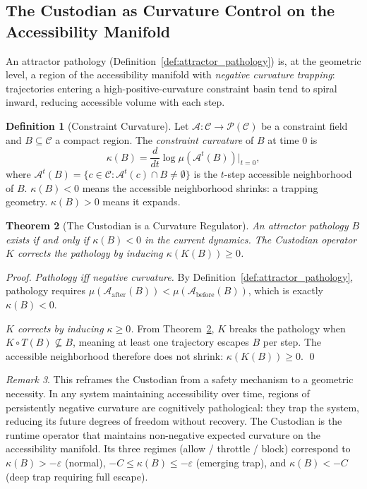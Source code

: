 \documentclass[12pt, a4paper, twoside]{article}
\theoremstyle{plain}
\newtheorem{theorem}{Theorem}[section]
\theoremstyle{definition}
\newtheorem{definition}[theorem]{Definition}
\theoremstyle{remark}
\newtheorem{remark}[theorem]{Remark}
\newcommand{\Acc}{\mathcal{A}}
\newcommand{\Conf}{\mathcal{C}}
\begin{document}
\subsection{The Custodian as Curvature Control on the Accessibility Manifold}

An attractor pathology (Definition~\ref{def:attractor_pathology}) is, at the
geometric level, a region of the accessibility manifold with \emph{negative
curvature trapping}: trajectories entering a high-positive-curvature constraint
basin tend to spiral inward, reducing accessible volume with each step.

\begin{definition}[Constraint Curvature]
\label{def:constraint_curvature}
Let $\Acc: \Conf \to \mathcal{P}(\Conf)$ be a constraint field and
$B \subseteq \Conf$ a compact region. The \emph{constraint curvature} of $B$
at time $0$ is
\[
  \kappa(B) = \frac{d}{dt}\log\mu(\Acc^t(B))\bigg|_{t=0},
\]
where $\Acc^t(B) = \{c \in \Conf : \Acc^t(c) \cap B \neq \emptyset\}$ is the
$t$-step accessible neighborhood of $B$. $\kappa(B)<0$ means the accessible
neighborhood shrinks: a trapping geometry. $\kappa(B)>0$ means it expands.
\end{definition}

\begin{theorem}[The Custodian is a Curvature Regulator]
\label{thm:custodian_curvature}
An attractor pathology $B$ exists if and only if $\kappa(B) < 0$ in the
current dynamics. The Custodian operator $K$ corrects the pathology by
inducing $\kappa(K(B)) \geq 0$.
\end{theorem}

\begin{proof}
\emph{Pathology iff negative curvature.} By Definition~\ref{def:attractor_pathology},
pathology requires $\mu(\Acc_{\mathrm{after}}(B)) < \mu(\Acc_{\mathrm{before}}(B))$,
which is exactly $\kappa(B)<0$.

\emph{$K$ corrects by inducing $\kappa \geq 0$.} From
Theorem~\ref{thm:custodian_curvature}, $K$ breaks the pathology when $K \circ T(B)
\not\subseteq B$, meaning at least one trajectory escapes $B$ per step. The
accessible neighborhood therefore does not shrink: $\kappa(K(B)) \geq 0$. \qed
\end{proof}

\begin{remark}
This reframes the Custodian from a safety mechanism to a geometric necessity.
In any system maintaining accessibility over time, regions of persistently
negative curvature are cognitively pathological: they trap the system,
reducing its future degrees of freedom without recovery. The Custodian is
the runtime operator that maintains non-negative expected curvature on the
accessibility manifold. Its three regimes (allow / throttle / block) correspond
to $\kappa(B) > -\varepsilon$ (normal), $-C \leq \kappa(B) \leq -\varepsilon$
(emerging trap), and $\kappa(B) < -C$ (deep trap requiring full escape).
\end{remark}
\end{document}
